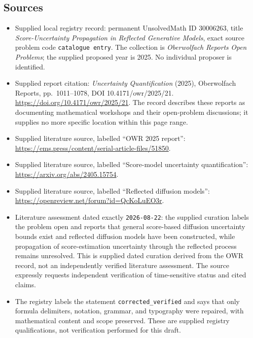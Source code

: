 \documentclass[11pt]{article}
\begin{document}
\subsection{Sources}
\begin{itemize}
\item Supplied local registry record: permanent UnsolvedMath ID \(30006263\), title \emph{Score-Uncertainty Propagation in Reflected Generative Models}, exact source problem code \texttt{catalogue entry}. The collection is \emph{Oberwolfach Reports Open Problems}; the supplied proposed year is 2025. No individual proposer is identified.
\item Supplied report citation: \emph{Uncertainty Quantification} (2025), Oberwolfach Reports, pp.\ 1011--1078, DOI 10.4171/owr/2025/21. \url{https://doi.org/10.4171/owr/2025/21}. The record describes these reports as documenting mathematical workshops and their open-problem discussions; it supplies no more specific location within this page range.
\item Supplied literature source, labelled ``OWR 2025 report'': \url{https://ems.press/content/serial-article-files/51850}.
\item Supplied literature source, labelled ``Score-model uncertainty quantification'': \url{https://arxiv.org/abs/2405.15754}.
\item Supplied literature source, labelled ``Reflected diffusion models'': \url{https://openreview.net/forum?id=QcKoLuEO3r}.
\item Literature assessment dated exactly \texttt{2026-08-22}: the supplied curation labels the problem open and reports that general score-based diffusion uncertainty bounds exist and reflected diffusion models have been constructed, while propagation of score-estimation uncertainty through the reflected process remains unresolved. This is supplied dated curation derived from the OWR record, not an independently verified literature assessment. The source expressly requests independent verification of time-sensitive status and cited claims.
\item The registry labels the statement \texttt{corrected\_verified} and says that only formula delimiters, notation, grammar, and typography were repaired, with mathematical content and scope preserved. These are supplied registry qualifications, not verification performed for this draft.
\end{itemize}
\end{document}
